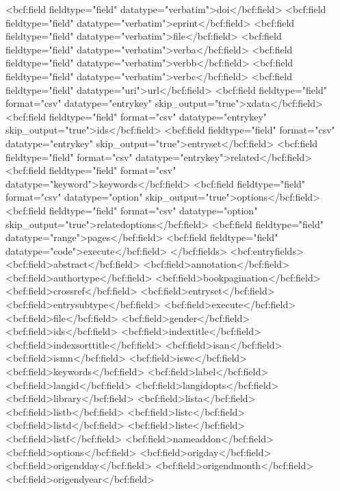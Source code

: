       <bcf:field fieldtype="field" datatype="verbatim">doi</bcf:field>
      <bcf:field fieldtype="field" datatype="verbatim">eprint</bcf:field>
      <bcf:field fieldtype="field" datatype="verbatim">file</bcf:field>
      <bcf:field fieldtype="field" datatype="verbatim">verba</bcf:field>
      <bcf:field fieldtype="field" datatype="verbatim">verbb</bcf:field>
      <bcf:field fieldtype="field" datatype="verbatim">verbc</bcf:field>
      <bcf:field fieldtype="field" datatype="uri">url</bcf:field>
      <bcf:field fieldtype="field" format="csv" datatype="entrykey" skip_output="true">xdata</bcf:field>
      <bcf:field fieldtype="field" format="csv" datatype="entrykey" skip_output="true">ids</bcf:field>
      <bcf:field fieldtype="field" format="csv" datatype="entrykey" skip_output="true">entryset</bcf:field>
      <bcf:field fieldtype="field" format="csv" datatype="entrykey">related</bcf:field>
      <bcf:field fieldtype="field" format="csv" datatype="keyword">keywords</bcf:field>
      <bcf:field fieldtype="field" format="csv" datatype="option" skip_output="true">options</bcf:field>
      <bcf:field fieldtype="field" format="csv" datatype="option" skip_output="true">relatedoptions</bcf:field>
      <bcf:field fieldtype="field" datatype="range">pages</bcf:field>
      <bcf:field fieldtype="field" datatype="code">execute</bcf:field>
    </bcf:fields>
    <bcf:entryfields>
      <bcf:field>abstract</bcf:field>
      <bcf:field>annotation</bcf:field>
      <bcf:field>authortype</bcf:field>
      <bcf:field>bookpagination</bcf:field>
      <bcf:field>crossref</bcf:field>
      <bcf:field>entryset</bcf:field>
      <bcf:field>entrysubtype</bcf:field>
      <bcf:field>execute</bcf:field>
      <bcf:field>file</bcf:field>
      <bcf:field>gender</bcf:field>
      <bcf:field>ids</bcf:field>
      <bcf:field>indextitle</bcf:field>
      <bcf:field>indexsorttitle</bcf:field>
      <bcf:field>isan</bcf:field>
      <bcf:field>ismn</bcf:field>
      <bcf:field>iswc</bcf:field>
      <bcf:field>keywords</bcf:field>
      <bcf:field>label</bcf:field>
      <bcf:field>langid</bcf:field>
      <bcf:field>langidopts</bcf:field>
      <bcf:field>library</bcf:field>
      <bcf:field>lista</bcf:field>
      <bcf:field>listb</bcf:field>
      <bcf:field>listc</bcf:field>
      <bcf:field>listd</bcf:field>
      <bcf:field>liste</bcf:field>
      <bcf:field>listf</bcf:field>
      <bcf:field>nameaddon</bcf:field>
      <bcf:field>options</bcf:field>
      <bcf:field>origday</bcf:field>
      <bcf:field>origendday</bcf:field>
      <bcf:field>origendmonth</bcf:field>
      <bcf:field>origendyear</bcf:field>
